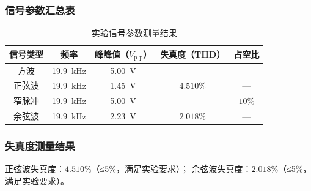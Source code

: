 \documentclass[twoside]{article}
\begin{document}
\subsubsection{信号参数汇总表}
\begin{table}[H]
    \centering
    \small
    \begin{tabular}{c c c c c}
        \toprule
        \textbf{信号类型} & \textbf{频率} & \textbf{峰峰值（$V_{\text{p-p}}$）} & \textbf{失真度（THD）} & \textbf{占空比} \\
        \midrule
        方波       & \SI{19.9}{\kilo\hertz} & \SI{5.00}{\volt} & — & — \\
        正弦波     & \SI{19.9}{\kilo\hertz} & \SI{1.45}{\volt} & $4.510\%$ & — \\
        窄脉冲     & \SI{19.9}{\kilo\hertz} & \SI{5.00}{\volt} & — & $10\%$ \\
        余弦波     & \SI{19.9}{\kilo\hertz} & \SI{2.23}{\volt} & $2.018\%$ & — \\
        \bottomrule
    \end{tabular}
    \caption{实验信号参数测量结果}
    \label{tab:signal-parameters}
\end{table}

\subsubsection{失真度测量结果}
正弦波失真度：$4.510\%$（≤5\%，满足实验要求）；
余弦波失真度：$2.018\%$（≤5\%，满足实验要求）。
\label{sec:thd-results}
\end{document}
